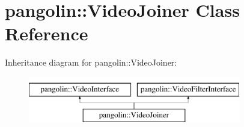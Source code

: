 \hypertarget{classpangolin_1_1_video_joiner}{}\section{pangolin\+:\+:Video\+Joiner Class Reference}
\label{classpangolin_1_1_video_joiner}
Inheritance diagram for pangolin\+:\+:Video\+Joiner\+:\begin{figure}[H]
\begin{center}
\leavevmode
\includegraphics[height=2.000000cm]{classpangolin_1_1_video_joiner}
\end{center}
\end{figure}
